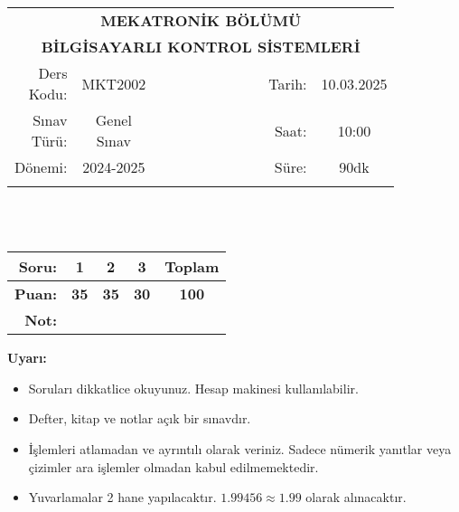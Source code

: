 \newcommand\UniversiteAdi{Niğde Ömer Halisdemir Üniversitesi}
\newcommand\BolumAdi{MEKATRONİK BÖLÜMÜ}
\newcommand\DersKodu{MKT2002}
\newcommand\DersAdi{BİLGİSAYARLI KONTROL SİSTEMLERİ}
\newcommand\SinavAdi{Genel Sınav}
\newcommand\SinavTarihi{10.03.2025}
\newcommand\SinavSaati{10:00}
\newcommand\SinavSuresi{90dk}

\pagestyle{fancy}
\fancyhf{} %
\noindent
\begin{tabular}{
    p{0.15\linewidth}
    p{0.15\linewidth}
    p{0.3\linewidth}
    p{0.1\linewidth}
    p{0.15\linewidth}}
    \multicolumn{5}{c}{\textbf{\BolumAdi}}\\
    \multicolumn{5}{c}{\textbf{\DersAdi}}\\\hline
    \multicolumn{1}{|r|}{Ders Kodu:}&
    \multicolumn{1}{|c|}{\DersKodu}&
    \multicolumn{1}{|c|}{}& 
    \multicolumn{1}{|r|}{Tarih:}&
    \multicolumn{1}{|c|}{\SinavTarihi} \\\hline
    \multicolumn{1}{|r|}{Sınav Türü:}&
    \multicolumn{1}{|c|}{\SinavAdi}&  
    \multicolumn{1}{|c|}{}&
    \multicolumn{1}{|r|}{Saat:}&
    \multicolumn{1}{|c|}{\SinavSaati}\\\hline
    \multicolumn{1}{|r|}{Dönemi:}&
    \multicolumn{1}{|c|}{2024-2025}&
    \multicolumn{1}{|c|}{}&
    \multicolumn{1}{|r|}{Süre:}&
    \multicolumn{1}{|c|}{\SinavSuresi} \\\hline
    &&&&\\
\end{tabular}\\\\
\noindent\begin{center}
\begin{tabular}{|r|c|c|c|c|}\hline
    \textbf{Soru:}&
    \textbf{1}&
    \textbf{2}&
    \textbf{3}&
    \textbf{Toplam}\\\hline
    \textbf{Puan:}&
    \textbf{35}&
    \textbf{35}&
    \textbf{30}&
    \textbf{100}\\\hline
    \textbf{Not:}&&&&\\\hline
\end{tabular}\end{center}
\noindent\textbf{Uyarı:}
\begin{itemize}\bfseries
    \item Soruları dikkatlice okuyunuz. Hesap makinesi kullanılabilir.
    \item Defter, kitap ve notlar açık bir sınavdır.
    \item İşlemleri atlamadan ve ayrıntılı olarak veriniz. Sadece nümerik yanıtlar veya çizimler ara işlemler olmadan kabul edilmemektedir.
    \item Yuvarlamalar 2 hane yapılacaktır. $\mathbf{1.99456\approx1.99}$ olarak alınacaktır.
\end{itemize}

